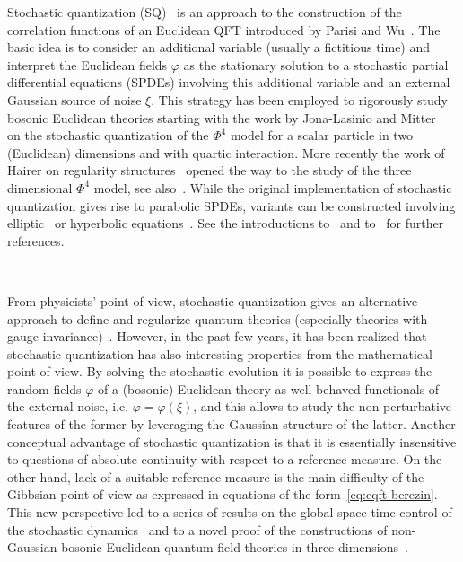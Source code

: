 \documentclass[11pt]{article}
\begin{document}
Stochastic quantization
(SQ)~{\cite{jona_lasinio_stochastic_1987,damgaard_stochastic_1988}} is an
approach to the construction of the correlation functions of an Euclidean QFT
introduced by Parisi and Wu~{\cite{parisi_perturbation_1981}}. The basic idea
is to consider an additional variable (usually a fictitious time) and
interpret the Euclidean fields $\varphi$ as the stationary solution to a
stochastic partial differential equations (SPDEs) involving this additional
variable and an external Gaussian source of noise $\xi$. This strategy has
been employed to rigorously study bosonic Euclidean theories starting with the
work by Jona-Lasinio and
Mitter~{\cite{jona_lasinio_stochastic_1985,jona_lasinio_large_1990,bertini_stochastic_1993}}
on the stochastic quantization of the $\Phi^4$ model for a scalar particle in
two (Euclidean) dimensions and with quartic interaction. More recently the
work of Hairer on regularity structures~{\cite{hairer_theory_2014}} opened the
way to the study of the three dimensional $\Phi^4$ model, see
also~{\cite{catellier_paracontrolled_2013,kupiainen_renormalization_2016}}.
While the original implementation of stochastic quantization gives rise to
parabolic SPDEs, variants can be constructed involving
elliptic~{\cite{albeverio_elliptic_2018,albeverio_elliptic_2019}} or
hyperbolic
equations~{\cite{gubinelli_renormalization_2018,gubinelli_paracontrolled_2018}}.
See the introductions to~{\cite{albeverio_invariant_2017}} and
to~{\cite{gubinelli_pde_2018}} for further references.

\

From physicists' point of view, stochastic quantization gives an alternative
approach to define and regularize quantum theories (especially theories with
gauge invariance)~{\cite{damgaard_stochastic_1988,bertini_stochastic_1993}}.
However, in the past few years, it has been realized that stochastic
quantization has also interesting properties from the mathematical point of
view. By solving the stochastic evolution it is possible to express the random
fields $\varphi$ of a (bosonic) Euclidean theory as well behaved functionals
of the external noise, i.e. $\varphi = \varphi (\xi)$, and this allows to
study the non-perturbative features of the former by leveraging the Gaussian
structure of the latter. Another conceptual advantage of stochastic
quantization is that it is essentially insensitive to questions of absolute
continuity with respect to a reference measure. On the other hand, lack of a
suitable reference measure is the main difficulty of the Gibbsian point of
view as expressed in equations of the form~{\eqref{eq:eqft-berezin}}. This new
perspective led to a series of results on the global space-time control of the
stochastic
dynamics~{\cite{MWcomedown,gubinelli_global_2019,albeverio_invariant_2017,moinat_space_time_2018}}
and to a novel proof of the constructions of non-Gaussian bosonic Euclidean
quantum field theories in three dimensions~{\cite{gubinelli_pde_2018}}.
\end{document}
